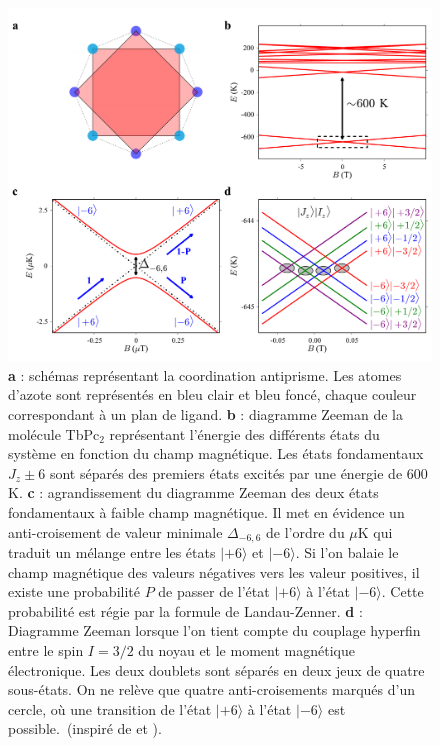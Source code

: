 \begin{figure}
\centering \includegraphics[scale=0.45]{Resultats/TbPc2Mag/TbPc2Mag.pdf} 
\caption{\textbf{a} : schémas représentant la coordination antiprisme. Les atomes d'azote sont représentés en bleu clair et bleu foncé, chaque couleur correspondant à un plan de ligand. \textbf{b} : diagramme Zeeman de la molécule TbPc$_2$ représentant l'énergie des différents états du système en fonction du champ magnétique. Les états fondamentaux $J_z \pm 6$ sont séparés des premiers états excités par une énergie de $600$\,K. \textbf{c} : agrandissement du diagramme Zeeman des deux états fondamentaux à faible champ magnétique. Il met en évidence un anti-croisement de valeur minimale $\Delta_{-6,6}$ de l'ordre du $\mu$K qui traduit un mélange entre les états $|+6\rangle$ et $|-6\rangle$. Si l'on balaie le champ magnétique des valeurs négatives vers les valeur positives, il existe une probabilité $P$ de passer de l'état $|+6\rangle$ à l'état $|-6\rangle$. Cette probabilité est régie par la formule de Landau-Zenner. \textbf{d} : Diagramme Zeeman lorsque l'on tient compte du couplage hyperfin entre le spin $I=3/2$ du noyau et le moment magnétique électronique. Les deux doublets sont séparés en deux jeux de quatre sous-états. On ne relève que quatre anti-croisements marqués d'un cercle, où une transition de l'état  $|+6\rangle$ à l'état $|-6\rangle$ est possible.~(inspiré de \cite{Ishikawa2005} et \cite{Sorace2011}).}
\label{TbPc2Zeeman}
\end{figure}


